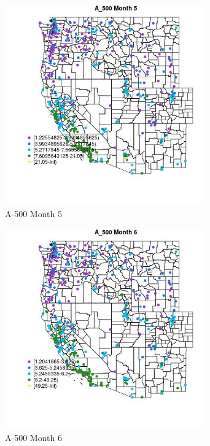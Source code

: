 \begin{figure} 
\centering  
\includegraphics[width=0.77\textwidth]{Code_Outputs/ML_input_report_ML_input_PM25_Step5_part_d_de_duplicated_aves_ML_input_MapObsMo5A_500.jpg} 
\caption{\label{fig:ML_input_report_ML_input_PM25_Step5_part_d_de_duplicated_aves_ML_inputMapObsMo5A_500}A-500 Month 5} 
\end{figure} 
 

\clearpage 

\begin{figure} 
\centering  
\includegraphics[width=0.77\textwidth]{Code_Outputs/ML_input_report_ML_input_PM25_Step5_part_d_de_duplicated_aves_ML_input_MapObsMo6A_500.jpg} 
\caption{\label{fig:ML_input_report_ML_input_PM25_Step5_part_d_de_duplicated_aves_ML_inputMapObsMo6A_500}A-500 Month 6} 
\end{figure} 
 


